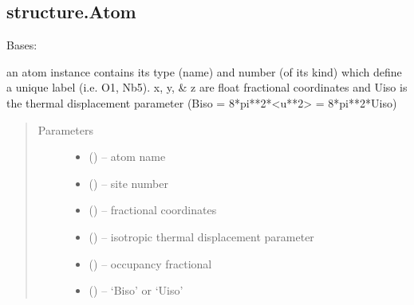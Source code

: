 \documentclass[letterpaper,10pt,english]{sphinxmanual}
\begin{document}
\subsection{structure.Atom}
\label{\detokenize{rst/structure:structure-atom}}

\begin{fulllineitems}
\label{\detokenize{rst/structure:mstack.structure.Atom}}
Bases: 

an atom instance contains its type (name) and number (of its kind) which define
a unique label (i.e. O1, Nb5). x, y, \& z are float fractional coordinates and
Uiso is the thermal displacement parameter (Biso =  8*pi**2*\textless{}u**2\textgreater{} = 8*pi**2*Uiso)
\begin{quote}\begin{description}
\item[{Parameters}] \leavevmode\begin{itemize}
\item {} 
 (\sphinxstyleliteralemphasis{*}) -- atom name

\item {} 
 (\sphinxstyleliteralemphasis{*}) -- site number

\item {} 
\sphinxstyleliteralstrong{, }\sphinxstyleliteralstrong{, } (\sphinxstyleliteralemphasis{*}) -- fractional coordinates

\item {} 
 (\sphinxstyleliteralemphasis{*}) -- isotropic thermal displacement parameter

\item {} 
 (\sphinxstyleliteralemphasis{*}) -- occupancy fractional

\item {} 
 (\sphinxstyleliteralemphasis{*}) -- `Biso' or `Uiso'

\end{itemize}

\end{description}\end{quote}


\end{fulllineitems}
\end{document}
